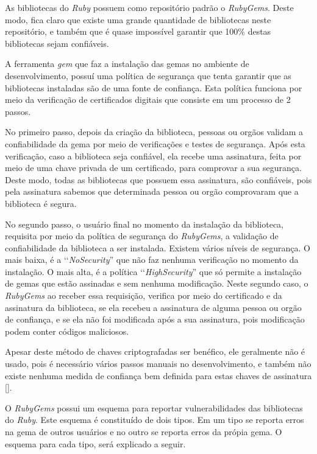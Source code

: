 As bibliotecas do \emph{Ruby} possuem como repositório padrão o \emph{RubyGems}. Deste modo, fica claro
que existe uma grande quantidade de bibliotecas neste repositório, e também que é quase impossível
garantir que 100\%  destas bibliotecas sejam confiáveis.

A ferramenta \emph{gem} que faz a instalação das gemas no ambiente de desenvolvimento, possuí uma política
de segurança que tenta garantir que as bibliotecas instaladas são de uma fonte de confiança. Esta política
funciona por meio da verificação de certificados digitais que consiste em um processo de 2 passos. 

No primeiro passo, depois da criação da biblioteca, pessoas ou orgãos validam a confiabilidade da gema por
meio de verificações e testes de segurança. Após esta verificação, caso a biblioteca seja confiável, ela
recebe uma assinatura, feita por meio de uma chave privada de um certificado, para comprovar a sua segurança.
Deste modo, todas as bibliotecas que possuem essa assinatura, são confiáveis, pois pela assinatura sabemos
que determinada pessoa ou orgão comprovaram que a biblioteca é segura.

No segundo passo, o usuário final no momento da instalação da biblioteca, requisita por meio da política
de segurança do \emph{RubyGems}, a validação de confiabilidade da biblioteca a ser instalada. Existem vários
níveis de segurança. O mais baixa, é a ‘‘\emph{NoSecurity}'' que não faz nenhuma verificação no momento da
instalação. O mais alta, é a política ‘‘\emph{HighSecurity}'' que só permite a instalação de gemas que
estão assinadas e sem nenhuma modificação. Neste segundo caso, o \emph{RubyGems} ao receber essa
requisição, verifica por meio do certificado e da assinatura da biblioteca, se ela recebeu a assinatura
de alguma pessoa ou orgão de confiança, e se ela não foi modificada após a sua assinatura, pois
modificação podem conter códigos maliciosos.

Apesar deste método de chaves criptografadas ser benéfico, ele geralmente não é usado, pois é necessário
vários passos manuais no desenvolvimento, e também não existe nenhuma medida de confiança bem definida
para estas chaves de assinatura [].

O \emph{RubyGems} possui um esquema para reportar vulnerabilidades das bibliotecas do \emph{Ruby}.
Este esquema é constituído de dois tipos. Em um tipo se reporta erros na gema de outros usuários e no outro
se reporta erros da própia gema. O esquema para cada tipo, será explicado a seguir.

